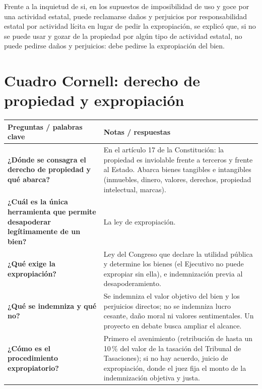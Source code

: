 \documentclass[12pt,oneside]{book}
\newlength{\cornellizq}
\newlength{\cornellder}
\begin{document}
\begin{note}
Frente a la inquietud de si, en los supuestos de imposibilidad de uso y goce por una actividad estatal, puede reclamarse daños y perjuicios por responsabilidad estatal por actividad lícita en lugar de pedir la expropiación, se explicó que, si no se puede usar y gozar de la propiedad por algún tipo de actividad estatal, no puede pedirse daños y perjuicios: debe pedirse la expropiación del bien.
\end{note}

\section{Cuadro Cornell: derecho de propiedad y expropiación}

\begin{longtable}{
    >{\raggedright\arraybackslash}p{\cornellizq}
    >{\raggedright\arraybackslash}p{\cornellder}
}
\toprule
\textbf{Preguntas / palabras clave} & \textbf{Notas / respuestas} \\
\midrule
\endhead

\textbf{¿Dónde se consagra el derecho de propiedad y qué abarca?} &
En el artículo 17 de la Constitución: la propiedad es inviolable frente a terceros y frente al Estado. Abarca bienes tangibles e intangibles (inmuebles, dinero, valores, derechos, propiedad intelectual, marcas). \\[0.8em]

\textbf{¿Cuál es la única herramienta que permite desapoderar legítimamente de un bien?} &
La ley de expropiación. \\[0.8em]

\textbf{¿Qué exige la expropiación?} &
Ley del Congreso que declare la utilidad pública y determine los bienes (el Ejecutivo no puede expropiar sin ella), e indemnización previa al desapoderamiento. \\[0.8em]

\textbf{¿Qué se indemniza y qué no?} &
Se indemniza el valor objetivo del bien y los perjuicios directos; no se indemniza lucro cesante, daño moral ni valores sentimentales. Un proyecto en debate busca ampliar el alcance. \\[0.8em]

\textbf{¿Cómo es el procedimiento expropiatorio?} &
Primero el avenimiento (retribución de hasta un 10\,\% del valor de la tasación del Tribunal de Tasaciones); si no hay acuerdo, juicio de expropiación, donde el juez fija el monto de la indemnización objetiva y justa. \\[0.8em]


\end{longtable}
\end{document}
